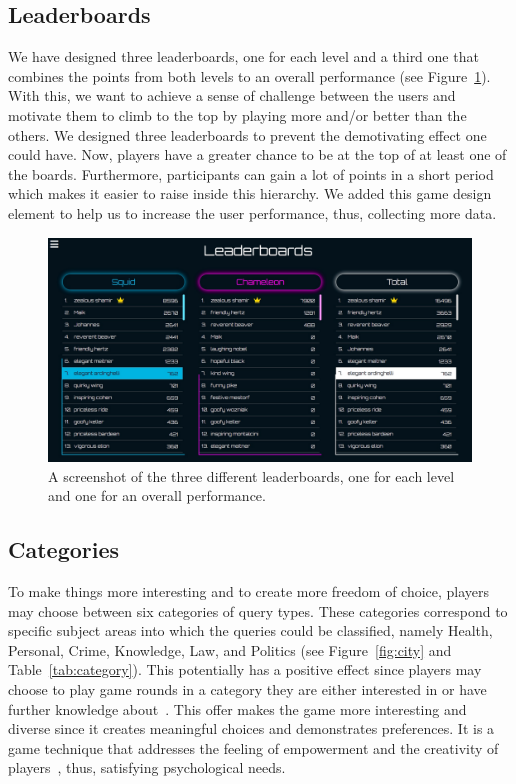 \subsection*{Leaderboards}
We have designed three leaderboards, one for each level and a third one that combines the points from both levels to an overall performance (see Figure~\ref{fig:leader}). With this, we want to achieve a sense of challenge between the users and motivate them to climb to the top by playing more and/or better than the others. We designed three leaderboards to prevent the demotivating effect one could have. Now, players have a greater chance to be at the top of at least one of the boards. Furthermore, participants can gain a lot of points in a short period which makes it easier to raise inside this hierarchy. We added this game design element to help us to increase the user performance, thus, collecting more data.
\begin{figure}[h]
    \includegraphics[width=1.0\textwidth]{graphics/game/leaderboards.pdf}
    \caption{A screenshot of the three different leaderboards, one for each level and one for an overall performance.}
    \label{fig:leader}
\end{figure}

\subsection*{Categories}
To make things more interesting and to create more freedom of choice, players may choose between six categories of query types. These categories correspond to specific subject areas into which the queries could be classified, namely Health, Personal, Crime, Knowledge, Law, and Politics (see Figure~\ref{fig:city} and Table~\ref{tab:category}). This potentially has a positive effect since players may choose to play game rounds in a category they are either interested in or have further knowledge about~\cite{gamifiedSearch}. This offer makes the game more interesting and diverse since it creates meaningful choices and demonstrates preferences. It is a game technique that addresses the feeling of empowerment and the creativity of players~\cite{actionableGamification}, thus, satisfying psychological needs.

